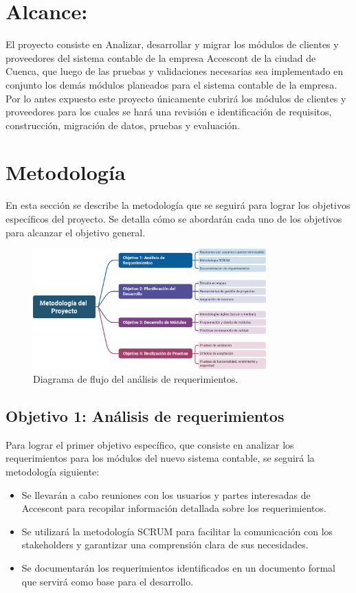 \documentclass{article}
\begin{document}
\section{Alcance:}
El proyecto consiste en Analizar, desarrollar y migrar los módulos de clientes y proveedores del sistema contable de la empresa Accescont de la ciudad de Cuenca, que luego de las pruebas y validaciones necesarias sea implementado en conjunto los demás módulos planeados para el sistema contable de la empresa. Por lo antes expuesto este proyecto únicamente cubrirá los módulos de clientes y proveedores para los cuales se hará una revisión e identificación de requisitos, construcción, migración de datos, pruebas y evaluación.

\section{Metodología}

En esta sección se describe la metodología que se seguirá para lograr los objetivos específicos del proyecto. Se detalla cómo se abordarán cada uno de los objetivos para alcanzar el objetivo general.

\begin{figure}[h]
    \centering
    \includegraphics[width=0.8\textwidth]{med.png}
    \caption{Diagrama de flujo del análisis de requerimientos.}
\end{figure}

\subsection{Objetivo 1: Análisis de requerimientos}

Para lograr el primer objetivo específico, que consiste en analizar los requerimientos para los módulos del nuevo sistema contable, se seguirá la metodología siguiente:

\begin{itemize}
    \item Se llevarán a cabo reuniones con los usuarios y partes interesadas de Accescont para recopilar información detallada sobre los requerimientos.
    \item Se utilizará la metodología SCRUM para facilitar la comunicación con los stakeholders y garantizar una comprensión clara de sus necesidades.
    \item Se documentarán los requerimientos identificados en un documento formal que servirá como base para el desarrollo.
\end{itemize}
\end{document}
